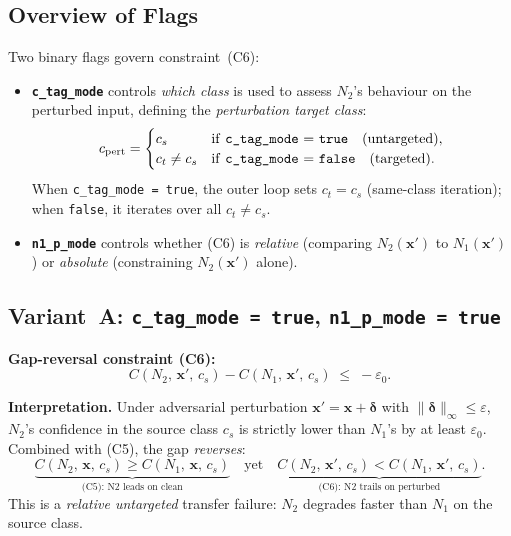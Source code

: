 \documentclass[11pt,a4paper]{article}
\theoremstyle{definition}
\theoremstyle{plain}
\newcommand{\Conf}[3]{C(#1,\,#2,\,#3)}
\newcommand{\NN}[1]{N_{#1}}
\newcommand{\vx}{\mathbf{x}}
\newcommand{\ve}{\boldsymbol{\delta}}
\newcommand{\vxp}{\mathbf{x}'}
\newcommand{\eps}{\varepsilon}
\newcommand{\epszero}{\varepsilon_0}
\begin{document}
\subsection{Overview of Flags}

Two binary flags govern constraint~(C6):

\begin{itemize}
  \item \textbf{\texttt{c\_tag\_mode}} controls \emph{which class} is used to assess $\NN{2}$'s behaviour on the perturbed input, defining the \emph{perturbation target class}:
    \[
      c_{\mathrm{pert}} = \begin{cases} c_s & \text{if \texttt{c\_tag\_mode} = \texttt{true}} \quad\text{(untargeted)}, \\ c_t \ne c_s & \text{if \texttt{c\_tag\_mode} = \texttt{false}} \quad\text{(targeted)}. \end{cases}
    \]
    When \texttt{c\_tag\_mode = true}, the outer loop sets $c_t = c_s$ (same-class iteration); when \texttt{false}, it iterates over all $c_t \ne c_s$.
  \item \textbf{\texttt{n1\_p\_mode}} controls whether (C6) is \emph{relative} (comparing $\NN{2}(\vxp)$ to $\NN{1}(\vxp)$) or \emph{absolute} (constraining $\NN{2}(\vxp)$ alone).
\end{itemize}

\subsection{Variant~A: \texttt{c\_tag\_mode = true}, \texttt{n1\_p\_mode = true}}

\textbf{Gap-reversal constraint (C6):}
\[
  \Conf{\NN{2}}{\vxp}{c_s} - \Conf{\NN{1}}{\vxp}{c_s} \;\le\; -\epszero.
\]

\textbf{Interpretation.}
Under adversarial perturbation $\vxp = \vx+\ve$ with $\|\ve\|_\infty \le \eps$, $\NN{2}$'s confidence in the source class $c_s$ is strictly lower than $\NN{1}$'s by at least $\epszero$. Combined with (C5), the gap \emph{reverses}:
\[
  \underbrace{\Conf{\NN{2}}{\vx}{c_s} \ge \Conf{\NN{1}}{\vx}{c_s}}_{\text{(C5): N2 leads on clean}} \quad\text{yet}\quad \underbrace{\Conf{\NN{2}}{\vxp}{c_s} < \Conf{\NN{1}}{\vxp}{c_s}}_{\text{(C6): N2 trails on perturbed}}.
\]
This is a \emph{relative untargeted} transfer failure: $\NN{2}$ degrades faster than $\NN{1}$ on the source class.
\end{document}
